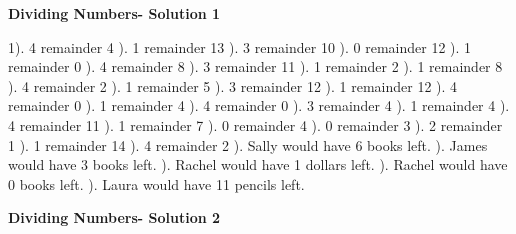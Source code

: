 \documentclass{article}%
\begin{document}
\newpage%
\large%
\begin{center}%
\textbf{Dividing Numbers- Solution 1}%
\newline%
\end{center} \normalsize%
1). 4 remainder 4%
). 1 remainder 13%
). 3 remainder 10%
). 0 remainder 12%
). 1 remainder 0%
). 4 remainder 8%
). 3 remainder 11%
). 1 remainder 2%
). 1 remainder 8%
). 4 remainder 2%
). 1 remainder 5%
). 3 remainder 12%
). 1 remainder 12%
). 4 remainder 0%
). 1 remainder 4%
). 4 remainder 0%
). 3 remainder 4%
). 1 remainder 4%
). 4 remainder 11%
). 1 remainder 7%
). 0 remainder 4%
). 0 remainder 3%
). 2 remainder 1%
). 1 remainder 14%
). 4 remainder 2%
). Sally would have 6 books left.%
). James would have 3 books left.%
). Rachel would have 1 dollars left.%
). Rachel would have 0 books left.%
). Laura would have 11 pencils left.%
\newline%
\newpage%
\large%
\begin{center}%
\textbf{Dividing Numbers- Solution 2}%
\newline%
\end{center} \normalsize%
\end{document}
